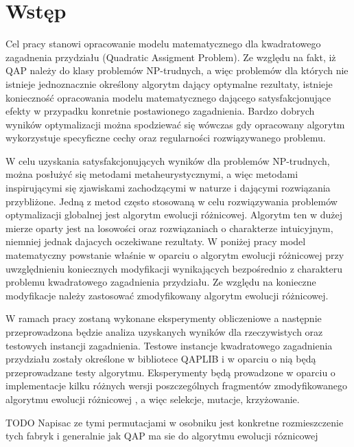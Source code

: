 \chapter{Wstęp}


Cel pracy stanowi opracowanie modelu matematycznego dla kwadratowego zagadnenia przydziału (Quadratic Assigment Problem). Ze względu na fakt, iż QAP należy do klasy problemów NP-trudnych, a więc problemów dla których nie istnieje jednoznacznie określony algorytm dający optymalne rezultaty, istnieje konieczność opracowania modelu matematycznego dającego satysfakcjonujące efekty w przypadku konretnie postawionego zagadnienia. Bardzo dobrych wyników optymalizacji można spodziewać się wówczas gdy opracowany algorytm wykorzystuje specyficzne cechy oraz regularności rozwiązywanego problemu. 

W celu uzyskania satysfakcjonujących wyników dla problemów NP-trudnych, można posłużyć się metodami metaheurystycznymi, a więc metodami inspirującymi się zjawiskami zachodzącymi w naturze i dającymi rozwiązania przybliżone. Jedną z metod często stosowaną w celu rozwiązywania problemów optymalizacji globalnej jest algorytm ewolucji różnicowej. Algorytm ten w dużej mierze oparty jest na losowości oraz rozwiązaniach o charakterze intuicyjnym, niemniej jednak dajacych oczekiwane rezultaty. W poniżej pracy model matematyczny powstanie właśnie w oparciu o algorytm ewolucji różnicowej przy uwzględnieniu koniecznych modyfikacji wynikających bezpośrednio z charakteru problemu kwadratowego zagadnienia przydziału. Ze względu na konieczne modyfikacje należy zastosować zmodyfikowany algorytm ewolucji różnicowej. 


 W ramach pracy zostaną wykonane eksperymenty obliczeniowe a następnie przeprowadzona będzie analiza uzyskanych wyników dla rzeczywistych oraz testowych instancji zagadnienia. Testowe instancje kwadratowego zagadnienia przydziału zostały określone w bibliotece QAPLIB i w oparciu o nią będą przeprowadzane testy algorytmu. Eksperymenty będą prowadzone w oparciu o implementacje kilku różnych wersji poszczególnych fragmentów zmodyfikowanego algorytmu ewolucji różnicowej , a więc selekcje, mutacje, krzyżowanie.

TODO 
Napisac ze tymi permutacjami w osobniku jest konkretne rozmieszczenie tych fabryk i generalnie jak QAP ma sie do algorytmu ewolucji róznicowej